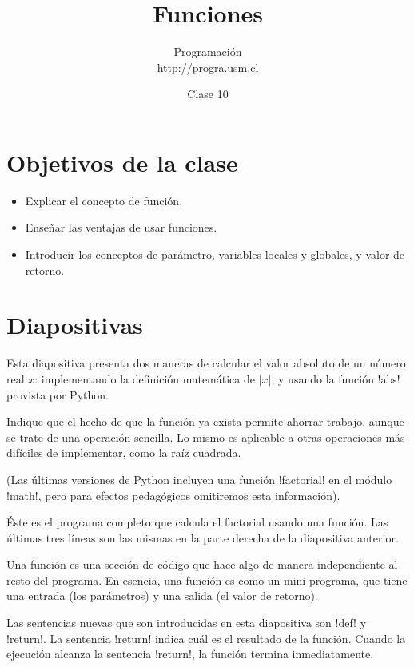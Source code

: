 \documentclass[10pt]{article}
\title{Funciones}
\author{Programación \\ \url{http://progra.usm.cl}}
\date{Clase 10}
\begin{document}
  \maketitle

  \section*{Objetivos de la clase}
  \begin{itemize}
    \item Explicar el concepto de función.
    \item Enseñar las ventajas de usar funciones.
    \item Introducir los conceptos de parámetro, variables locales y globales,
      y valor de retorno.
  \end{itemize}

  \section*{Diapositivas}


  Esta diapositiva presenta dos maneras de calcular
  el valor absoluto de un número real \(x\):
  implementando la definición matemática de \(\lvert x\rvert\),
  y usando la función \li!abs! provista por Python.

  Indique que el hecho de que la función ya exista
  permite ahorrar trabajo, aunque se trate de una operación sencilla.
  Lo mismo es aplicable a otras operaciones más difíciles de implementar,
  como la raíz cuadrada.


  

  (Las últimas versiones de Python incluyen una función \li!factorial!
  en el módulo \li!math!,
  pero para efectos pedagógicos
  omitiremos esta información).


  Éste es el programa completo
  que calcula el factorial
  usando una función.
  Las últimas tres líneas son las mismas
  en la parte derecha de la diapositiva anterior.

  Una función es una sección de código que hace algo
  de manera independiente al resto del programa.
  En esencia,
  una función es como un mini programa,
  que tiene una entrada (los parámetros)
  y una salida (el valor de retorno).

  Las sentencias nuevas que son introducidas en esta diapositiva
  son \li!def! y \li!return!.
  La sentencia \li!return! indica cuál es el resultado de la función.
  Cuando la ejecución alcanza la sentencia \li!return!,
  la función termina inmediatamente.
\end{document}

